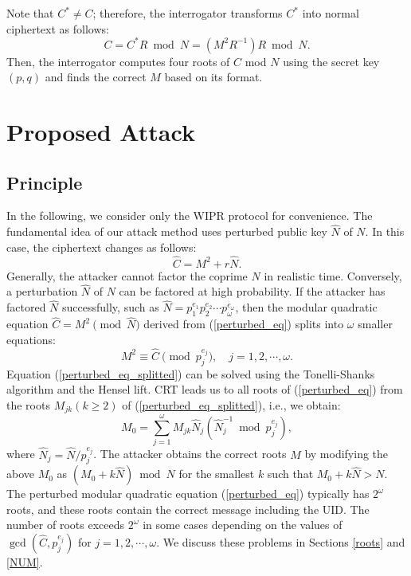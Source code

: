 \documentclass{article}
\begin{document}
Note that $C^*\ne C$; therefore, 
the interrogator transforms $C^*$ into normal ciphertext as follows:
$$
C = C^*R\bmod N = (M^2R^{-1})R\bmod N.
$$
Then, the interrogator computes four roots of $C$ mod $N$ using the secret key $(p,q)$ 
and finds the correct $M$ based on its format.


\section{Proposed Attack}

\subsection{Principle}
In the following, we consider only the WIPR protocol for convenience. 
The fundamental idea of our attack method uses perturbed public key $\hat{N}$ of $N$.
In this case, the ciphertext changes as follows:
\begin{equation}\label{perturbed_eq}
\hat{C} = M^2 + r\hat{N}.
\end{equation}
Generally, the attacker cannot factor the coprime $N$ in realistic time.
Conversely, a perturbation $\hat{N}$ of $N$ can be factored at high probability. 
If the attacker has factored $\hat{N}$ successfully, such as 
$\hat{N}=p_1^{e_1}p_2^{e_2}\cdots p_{\omega}^{e_{\omega}}$, 
then the modular quadratic equation 
$\hat{C} = M^2 \pmod{\hat{N}}$ derived from (\ref{perturbed_eq}) splits into $\omega$ smaller 
equations: 
\begin{equation}\label{perturbed_eq_splitted}
 M^2\equiv \hat{C} \pmod{p_j^{e_j}}, \quad j=1,2,\cdots, \omega.
\end{equation}
Equation (\ref{perturbed_eq_splitted}) can be solved using the 
Tonelli-Shanks algorithm and the Hensel lift. 
CRT leads us to all roots of (\ref{perturbed_eq}) 
from the roots $M_{jk}(k\geq 2)$ of (\ref{perturbed_eq_splitted}), i.e., 
we obtain:
\begin{equation}\label{CRT}
M_0 = \sum_{j=1}^{\omega}M_{jk}\hat{N}_j(\hat{N}_j^{-1}\bmod p_j^{e_j}),
\end{equation}
where $\hat{N}_j=\hat{N}/p_j^{e_j}$. 
The attacker obtains the correct roots $M$ by modifying the above $M_0$ as $(M_0+k\hat{N})\bmod{N}$ for 
the smallest $k$ such that $M_0+k\hat{N}>N$. 
The perturbed modular quadratic equation (\ref{perturbed_eq}) typically has $2^{\omega}$ roots, and 
these roots contain the correct message including the UID.
The number of roots exceeds $2^{\omega}$ in some cases depending 
on the values of $\gcd(\hat{C},p_j^{e_j})$ for $j=1,2,\cdots,\omega$. 
We discuss these problems in Sections \ref{roots} and \ref{NUM}.
\end{document}

